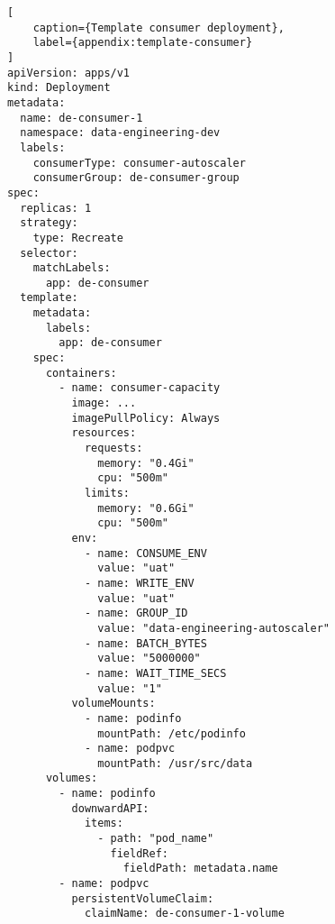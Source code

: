 \begin{lstlisting}[
    caption={Template consumer deployment}, 
    label={appendix:template-consumer}
]
apiVersion: apps/v1
kind: Deployment
metadata:
  name: de-consumer-1
  namespace: data-engineering-dev
  labels: 
    consumerType: consumer-autoscaler
    consumerGroup: de-consumer-group
spec:
  replicas: 1
  strategy: 
    type: Recreate
  selector:
    matchLabels:
      app: de-consumer
  template:
    metadata:
      labels:
        app: de-consumer
    spec:
      containers:
        - name: consumer-capacity
          image: ...
          imagePullPolicy: Always
          resources:
            requests: 
              memory: "0.4Gi"
              cpu: "500m"
            limits: 
              memory: "0.6Gi"
              cpu: "500m"
          env: 
            - name: CONSUME_ENV
              value: "uat"
            - name: WRITE_ENV
              value: "uat"
            - name: GROUP_ID
              value: "data-engineering-autoscaler"
            - name: BATCH_BYTES
              value: "5000000"
            - name: WAIT_TIME_SECS
              value: "1"
          volumeMounts:
            - name: podinfo
              mountPath: /etc/podinfo
            - name: podpvc
              mountPath: /usr/src/data
      volumes:
        - name: podinfo
          downwardAPI:
            items:
              - path: "pod_name"
                fieldRef:
                  fieldPath: metadata.name
        - name: podpvc
          persistentVolumeClaim:
            claimName: de-consumer-1-volume
\end{lstlisting}
